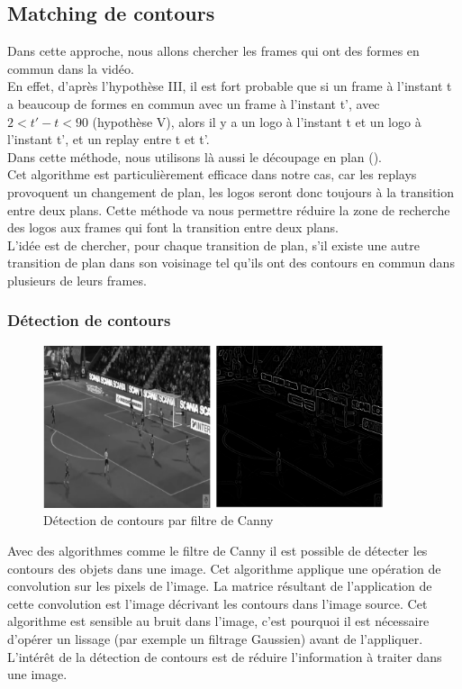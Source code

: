 \documentclass[11pt]{article}
\begin{document}
\subsection{Matching de contours}
\label{sec:org00fe23d}
Dans cette approche, nous allons chercher les frames qui ont des formes en commun dans la vidéo.\\
En effet, d'après l'hypothèse III, il est fort probable que si un frame à l'instant t a beaucoup de formes en commun avec un frame à l'instant t', avec \(2 < t' - t < 90\) (hypothèse V), alors il y a un logo à l'instant t et un logo à l'instant t', et un replay entre t et t'.\\

Dans cette méthode, nous utilisons là aussi le découpage en plan (\cite{Abd_Almageed_2008}).\\
Cet algorithme est particulièrement efficace dans notre cas, car les replays provoquent un changement de plan, les logos seront donc toujours à la transition entre deux plans. Cette méthode va nous permettre réduire la zone de recherche des logos aux frames qui font la transition entre deux plans.\\

L'idée est de chercher, pour chaque transition de plan, s'il existe une autre transition de plan dans son voisinage tel qu'ils ont des contours en commun dans plusieurs de leurs frames.\\

\subsubsection{Détection de contours}
\label{sec:orgee5191f}
\begin{figure}[htbp]
\centering
\includegraphics[width=10cm]{canny_edge2.png}
\caption{Détection de contours par filtre de Canny}
\end{figure}
Avec des algorithmes comme le filtre de Canny il est possible de détecter les contours des objets dans une image. Cet algorithme applique une opération de convolution sur les pixels de l'image. La matrice résultant de l'application de cette convolution est l'image décrivant les contours dans l'image source. Cet algorithme est sensible au bruit dans l'image, c'est pourquoi il est nécessaire d'opérer un lissage (par exemple un filtrage Gaussien) avant de l'appliquer.\\
L'intérêt de la détection de contours est de réduire l'information à traiter dans une image.\\
\end{document}
